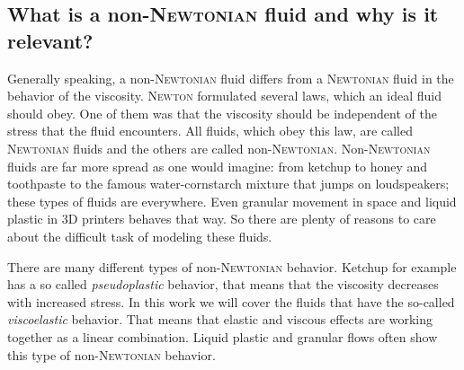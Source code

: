 \documentclass[12pt,a4paper,twoside, open=right]{scrreprt}
\theoremstyle{definition}
\theoremstyle{plain}
\begin{document}
\subsection{What is a non-\textsc{Newtonian} fluid and why is it relevant?}
Generally speaking, a non-\textsc{Newtonian} fluid differs from a \textsc{Newtonian} fluid in the behavior of the viscosity. \textsc{Newton} formulated several laws, which an ideal fluid should obey. One of them was that the viscosity should be independent of the stress that the fluid encounters. All fluids, which obey this law, are called \textsc{Newtonian} fluids and the others are called non-\textsc{Newtonian}. Non-\textsc{Newtonian} fluids are far more spread as one would imagine: from ketchup to honey and toothpaste to the famous water-cornstarch mixture that jumps on loudspeakers; these types of fluids are everywhere. Even granular movement in space and liquid plastic in 3D printers behaves that way. So there are plenty of reasons to care about the difficult task of modeling these fluids. \par 
There are many different types of non-\textsc{Newtonian} behavior. Ketchup for example has a so called \emph{pseudoplastic} behavior, that means that the viscosity decreases with increased stress. In this work we will cover the fluids that have the so-called \emph{viscoelastic} behavior. That means that elastic and viscous effects are working together as a linear combination. Liquid plastic and granular flows often show this type of non-\textsc{Newtonian} behavior.
\end{document}
